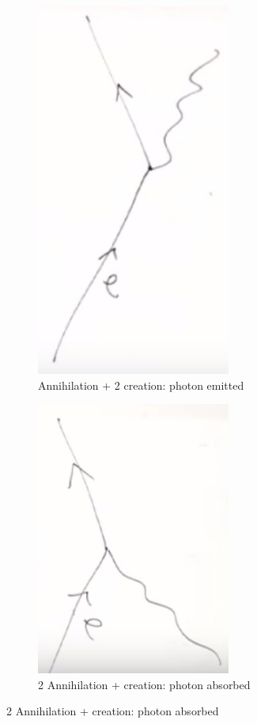 \documentclass[]{article}
\begin{document}
\begin{figure}[H]
	\caption{Interactions arising from Lagrangian (\ref{eq:basic:interaction})}
	\begin{subfigure}{0.48\textwidth}
		\caption{Annihilation + 2 creation: photon emitted}
		\includegraphics[width=0.7\textwidth]{em-dirac1}
	\end{subfigure}
	\begin{subfigure}{0.48\textwidth}
		\caption{2 Annihilation +  creation: photon absorbed}
		\includegraphics[width=0.7\textwidth]{em-dirac2}

\end{subfigure}
\end{figure}
\end{document}
